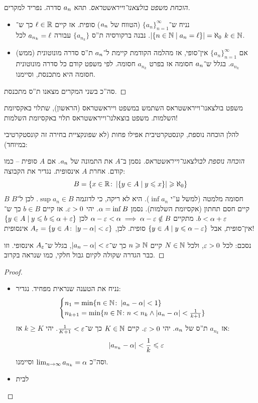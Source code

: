 \documentclass[name=רשימות חשבון דיפרנציאלי ואינטגרלי 1א]{../../../tex/classes/megasumPreamble}
\begin{document}
	\begin{proof}[הוכחת משפט בולצאנו־וייראשטראס]
		תהא $a_n$ סדרה. נפריד למקרים.
		\begin{itemize}
			\item נניח ש־$\{a_n\}_{n = 1}^{\infty}$ (הטווח של $a_n$) סופית. אז קיים $\ell \in \mathbb{R}$ כך ש־$\left \lvert \{n \in \mathbb{N} \mid a_n = \ell\} \right \rvert = \aleph_0$. נבנה ברקורסיה ת''ס $\{a_{n_k}\}$ עבורה $a_{n_k} = \ell$ לכל $k \in \mathbb{N}$.
			\item אם $\{a_n\}_{n = 1}^{\infty}$ אין־סופי, אז מהלמה הקודמת קיימת ל־$a_n$ ת''ס סדרה מונוטונית (ממש) $a_{n_k}$. בגלל ש־$a_n$ חסומה אז בפרט $a_{n_k}$ חסומה. לפי משפט קודם כל סדרה מונוטונית חסומה היא מתכנסת, וסיימנו.
		\end{itemize}
		סה''כ בשני המקרים מצאנו ת''ס מתכנסת.
	\end{proof}
	משפט בולצאנו־וייראשטראס השתמש במשפט וייראשטראס (הראשון), שתלוי באקסיומת השלמות. משפט בוצאלנו־וייראשטראס תלוי באקסיומת השלמות!

	להלן הוכחה נוספת, קונסטקרטיבית אפילו פחות (לא שפונקציית בחירה זה קונסטקרטיבי במיוחד):
	\begin{proof}[הוכחה נוספת לבולצאנו־וייראשטראס]
		נסמן ב־$A$ את התמונה של $a_n$. אם $A$ סופית – כמו קודם. אחרת $A$ אינסופית. נגדיר את הקבוצה:
		\[ B = \{x \in \mathbb{R} \colon \left \lvert \{y \in A \mid y \leqslant x\} \right \rvert \geqslant \aleph_0\} \]
		$B$ חסומה מלמטה (למשל ע''י $\inf a_n$). היא לא ריקה, כי לדוגמה $\sup a_n \in B$. לכן ל־$B$ קיים חסם תחתון (אקסיומת השלמות). נסמן $\alpha = \inf B$. יהי $\eg > 0$. אז קיים $b \in B$ כך ש־$b < \ag + \eg$. מתקיים $\ag - \eg < \ag \implies \ag - \eg \notin B$  לכן $\{y \in A \mid y \le b \le \ag + \eg\}$ אין־סופית, אבל $\{y \in A \mid y \le \ag - \eg\}$ סופית. לכן, $A_{\eg} = \{y \in A \co \sof{y - \ag} < \eg\}$ אינסופית!

		נסכם: לכל $\eg > 0$, ולכל $N \in \mathbb{N}$ קיים $n \geqslant \mathbb{N}$ כך ש־$\sof{a_n - \ag} < \eg$, בגלל ש־$A_\eg$ אינסופי.  וזו כבר הגדרה שקולה לקיום גבול חלקי, כמו שנראה בקרוב.
	\end{proof}
	 \begin{proof}
		\begin{itemize}
			\item[$\impliedby$]נניח את הטענה שנראית מפחיד. נגדיר:
			\[ \begin{cases}
				n_1 = \min\{n \in \mathbb{N} \colon \left \lvert a_n - \alpha \right \rvert < 1\} \\
				n_{k + 1} = \min \{n \in \mathbb{N} \colon n < n_k \land \left \lvert a_n - \alpha \right \rvert < \frac{1}{k + 1}\}
			\end{cases} \]
			אז $a_{n_{k}}$ ת''ס של $a_n$. יהי $\eg > 0$. קיים $K \in \mathbb{N}$ כך ש־$\frac{1}{K + 1} < \eg$. יהי $k \ge K$ אז:
			\[ \sof{a_{n_k} - \ag} < \frac{1}{k} \le \eg \]
			וסה''כ $\lim_{n \to \infty} a_{n_k} = \alpha$ וסיימנו.
			\item[$\implies$]לבית
		\end{itemize}
	\end{proof}
\end{document}
